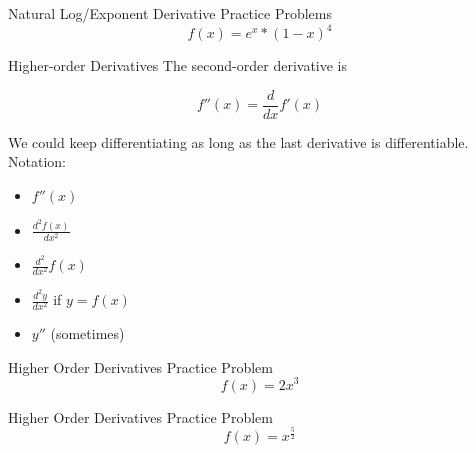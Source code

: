 \documentclass[aspectratio=169]{beamer}
\begin{document}
\begin{frame}{Natural Log/Exponent Derivative Practice Problems}\label{main1}
	\vspace{-4cm}
    \[
    f(x) = e^{x}*(1-x)^{4}
    \]
\end{frame}

\begin{frame}{Higher-order Derivatives}\label{main1}
The second-order derivative is

\[
f''(x) = \frac{d}{dx} f'(x)
\]

We could keep differentiating as long as the last derivative is differentiable. Notation:
\begin{itemize}
\begin{itemize}
    \item $f''(x)$
    \item $\frac{d^2 f(x)}{dx^2}$
    \item $\frac{d^2}{dx^2} f(x)$
    \item $\frac{d^2 y}{dx^2}$ if $y = f(x)$
    \item $y''$ (sometimes)
\end{itemize}
\end{itemize}
\end{frame}

\begin{frame}{Higher Order Derivatives Practice Problem}\label{main1}
	\vspace{-4cm}
    \[
    f(x) = 2x^{3}
    \]
\end{frame}

\begin{frame}{Higher Order Derivatives Practice Problem}\label{main1}
	\vspace{-4cm}
    \[
    f(x) = x^{\frac{5}{2}}
    \]
\end{frame}
\end{document}
